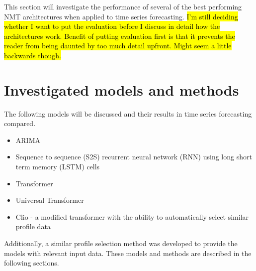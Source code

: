 \par
This section will investigate the performance of several of the best performing NMT architectures when applied to time series forecasting.
\hl{I'm still deciding whether I want to put the evaluation before I discuss in detail how the architectures work.
	Benefit of putting evaluation first is that it prevents the reader from being daunted by too much detail upfront.
	Might seem a little backwards though.}

\section{Investigated models and methods}
The following models will be discussed and their results in time series forecasting compared.
\begin{itemize}
	\item ARIMA
	\item Sequence to sequence (S2S) recurrent neural network (RNN) \citep{Cho2014a} using long short term memory (LSTM) \citep{hochreiter1997long} cells
	\item Transformer \citep{Vaswani2017}
	\item Universal Transformer \cite{Dehghani2018}
	\item Clio - a modified transformer with the ability to automatically select similar profile data
\end{itemize}

Additionally, a similar profile selection method was developed to provide the models with relevant input data.
These models and methods are described in the following sections.

